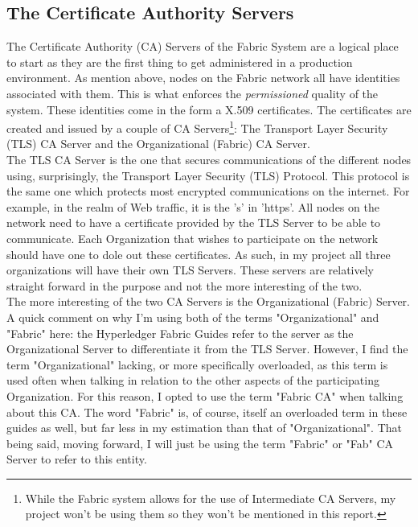 	\subsection{The Certificate Authority Servers}
		\hspace{10mm}The Certificate Authority (CA) Servers of the Fabric System are a logical place to start as they are the first thing to get administered in a production environment. As mention above, nodes on the Fabric network all have identities associated with them. This is what enforces the \textit{permissioned} quality of the system. These identities come in the form a X.509 certificates. The certificates are created and issued by a couple of CA Servers\footnote{While the Fabric system allows for the use of Intermediate CA Servers, my project won't be using them so they won't be mentioned in this report.}: The Transport Layer Security (TLS) CA Server and the Organizational (Fabric) CA Server.\\
		
		\hspace{10mm}The TLS CA Server is the one that secures communications of the different nodes using, surprisingly, the Transport Layer Security (TLS) Protocol. This protocol is the same one which protects most encrypted communications on the internet. For example, in the realm of Web traffic, it is the 's' in 'https'. All nodes on the network need to have a certificate provided by the TLS Server to be able to communicate. Each Organization that wishes to participate on the network should have one to dole out these certificates. As such, in my project all three organizations will have their own TLS Servers. These servers are relatively straight forward in the purpose and not the more interesting of the two.\\
		
		\hspace{10mm}The more interesting of the two CA Servers is the Organizational (Fabric) Server. A quick comment on why I'm using both of the terms "Organizational" and "Fabric" here: the Hyperledger Fabric Guides refer to the server as the Organizational Server to differentiate it from the TLS Server. However, I find the term "Organizational" lacking, or more specifically overloaded, as this term is used often when talking in relation to the other aspects of the participating Organization. For this reason, I opted to use the term "Fabric CA" when talking about this CA. The word "Fabric" is, of course, itself an overloaded term in these guides as well, but far less in my estimation than that of "Organizational". That being said, moving forward, I will just be using the term "Fabric" or "Fab" CA Server to refer to this entity.\\
		
